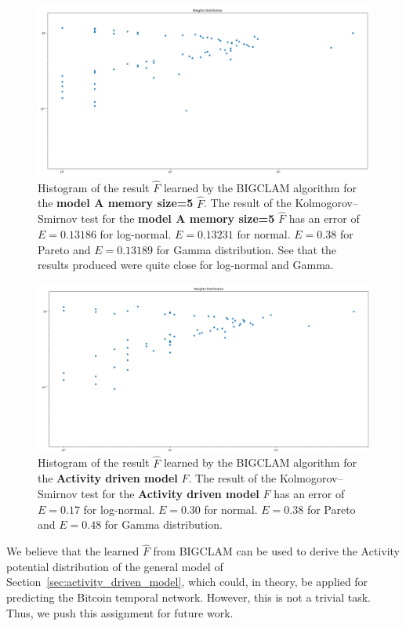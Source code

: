 \documentclass[../../thesis.tex]{subfiles}
\begin{document}
\begin{figure}[H]
\centering
\includegraphics[width=\textwidth]{content/learning/img/memoryallBigclam151575059300_bigclam_f_hist}
\caption{Histogram of the result $\hat{F}$ learned by the BIGCLAM algorithm for the \textbf{model A memory size=5} $\hat{F}$. The result of the Kolmogorov–Smirnov test for the \textbf{model A memory size=5} $\hat{F}$ has an error of $E=0.13186$ for log-normal. $E=0.13231$ for normal. $E=0.38$ for Pareto and $E=0.13189$ for Gamma distribution. See that the results produced were quite close for log-normal and Gamma.}
\label{fig:memoryallBigclam151575059300_bigclam_f_hist}
\end{figure} 


\begin{figure}[H]
\centering
\includegraphics[width=\textwidth]{content/learning/img/activitydrivenBigclam151574987200_bigclam_f_hist}
\caption{Histogram of the result $\hat{F}$ learned by the BIGCLAM algorithm for the \textbf{Activity driven model} $\hat{F}$. The result of the Kolmogorov–Smirnov test for the \textbf{Activity driven model} $\hat{F}$ has an error of $E=0.17$ for log-normal. $E=0.30$ for normal. $E=0.38$ for Pareto and $E=0.48$ for Gamma distribution. }
\label{fig:activitydrivenBigclam151574987200_bigclam_f_hist}
\end{figure} 

We believe that the learned $\hat{F}$ from BIGCLAM can be used to derive the Activity potential distribution of the general model of Section~\ref{sec:activity_driven_model}, which could, in theory, be applied for predicting the Bitcoin temporal network. However, this is not a trivial task. Thus, we push this assignment for future work. 
\end{document}
